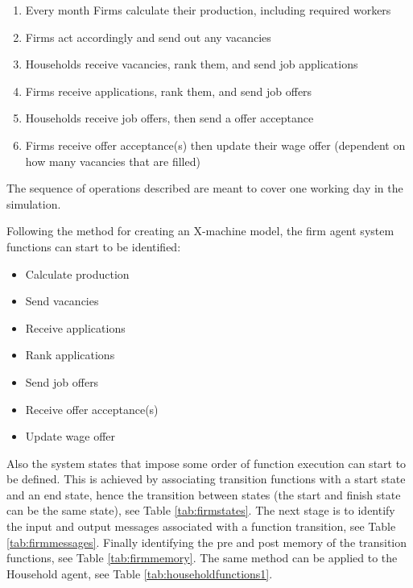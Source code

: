 \documentclass[a4paper,11pt]{article}
\begin{document}
\begin{enumerate}
\item Every month Firms calculate their production, including required workers
\item Firms act accordingly and send out any vacancies
\item Households receive vacancies, rank them, and send job applications
\item Firms receive applications, rank them, and send job offers
\item Households receive job offers, then send a offer acceptance
\item Firms receive offer acceptance(s) then update their wage offer (dependent on how many vacancies that are filled)
\end{enumerate}

The sequence of operations described are meant to cover one working day in the simulation.

Following the method for creating an X-machine model, the firm agent system functions can start to be identified:

\begin{itemize}
\item Calculate production
\item Send vacancies
\item Receive applications
\item Rank applications
\item Send job offers
\item Receive offer acceptance(s)
\item Update wage offer
\end{itemize}

Also the system states that impose some order of function execution can start to be defined. This is achieved by associating transition functions with a start state and an end state, hence the transition between states (the start and finish state can be the same state), see Table \ref{tab:firmstates}. The next stage is to identify the input and output messages associated with a function transition, see Table \ref{tab:firmmessages}. Finally identifying the pre and post memory of the transition functions, see Table \ref{tab:firmmemory}. The same method can be applied to the Household agent, see Table \ref{tab:householdfunctions1}.
\end{document}
